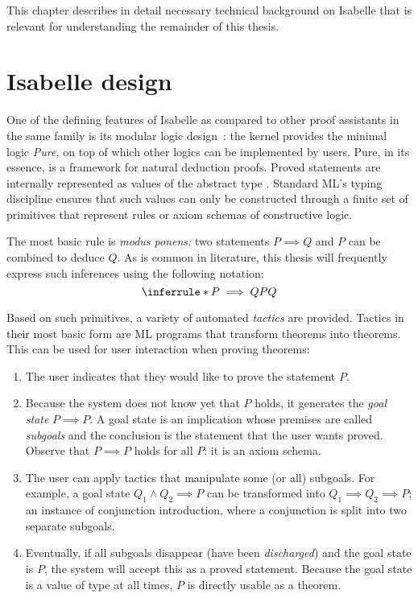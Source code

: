 
\noindent
This chapter describes in detail necessary technical background on Isabelle that is relevant for understanding the remainder of this thesis.

\section{Isabelle design}

One of the defining features of Isabelle as compared to other proof assistants in the same family is its modular logic design~\cite{paulson1990isabelle}:
the kernel provides the minimal logic \emph{Pure,} on top of which other logics can be implemented by users.
Pure, in its essence, is a framework for natural deduction proofs.
Proved statements are internally represented as values of the abstract type .
Standard ML's typing discipline ensures that such values can only be constructed through a finite set of primitives that represent rules or axiom schemas of constructive logic.

The most basic rule is \emph{modus ponens:} two statements $P \implies Q$ and $P$ can be combined to deduce $Q$.
As is common in literature, this thesis will frequently express such inferences using the following notation:
\[
  \inferrule*{P \implies Q \\ P}{Q}
\]

\noindent
Based on such primitives, a variety of automated \emph{tactics} are provided.
Tactics in their most basic form are ML programs that transform theorems into theorems.
This can be used for user interaction when proving theorems:
\begin{enumerate}
  \item
    The user indicates that they would like to prove the statement $P$.
  \item
    Because the system does not know yet that $P$ holds, it generates the \emph{goal state} $P \implies P$.
    A goal state is an implication whose premises are called \emph{subgoals} and the conclusion is the statement that the user wants proved.
    Observe that $P \implies P$ holds for all $P$: it is an axiom schema.
  \item
    The user can apply tactics that manipulate some (or all) subgoals.
    For example, a goal state $Q_1 \wedge Q_2 \implies P$ can be transformed into $Q_1 \implies Q_2 \implies P$; an instance of conjunction introduction, where a conjunction is split into two separate subgoals.
  \item
    Eventually, if all subgoals disappear (have been \emph{discharged}) and the goal state is $P$, the system will accept this as a proved statement.
    Because the goal state is a value of type  at all times, $P$ is directly usable as a theorem.
\end{enumerate}

